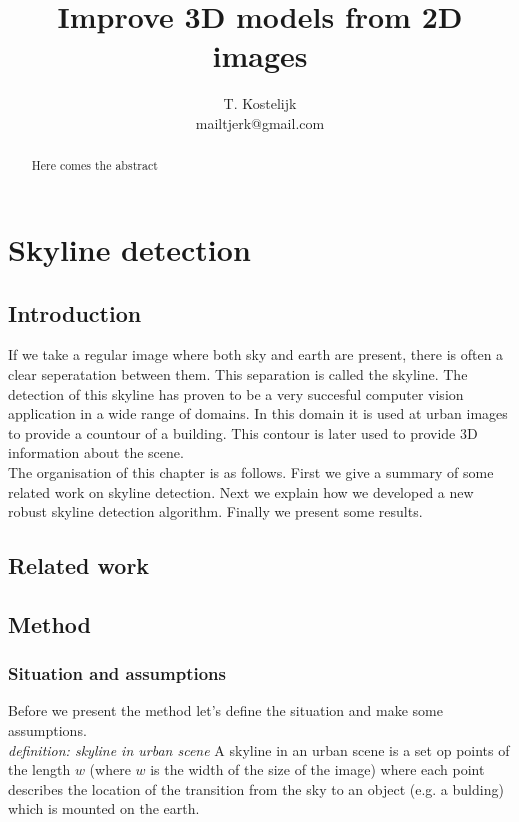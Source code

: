 \documentclass[10pt]{article}
\title{\sc Improve 3D models from 2D images}
\author{T. Kostelijk\\mailtjerk@gmail.com}
\begin{document}
\maketitle

\begin{abstract}
Here comes the abstract
\end{abstract}


\section{Skyline detection}
 \subsection{Introduction}
If we take a regular image where both sky and earth are present, there
is often a clear seperatation between them. This separation is called the
skyline. %
The detection of this skyline has proven to be a very succesful computer vision
application in a wide range of domains. In this domain it is used at urban
images to provide a countour of a building. This contour is later used to
provide 3D information about the scene.\\
The organisation of this chapter is as follows.  First we give a summary of some
related work on skyline detection.  Next we explain how we developed a new
robust skyline detection algorithm.  Finally we present some results.

\subsection{Related work}

\subsection{Method} %
\subsubsection{Situation and assumptions}
Before we present the method let's define the situation and make some
assumptions.\\

\textit{definition: skyline in urban scene}
A skyline in an urban scene is a set op points of the length $w$ (where $w$ is the
width of the size of the image) where each point describes the location of the
transition from the sky to an object (e.g. a bulding) which is mounted on the earth.
\end{document}
